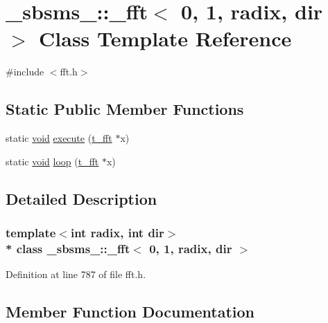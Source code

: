 \hypertarget{class__sbsms___1_1__fft_3_010_00_011_00_01radix_00_01dir_01_4}{}\section{\+\_\+sbsms\+\_\+\+:\+:\+\_\+fft$<$ 0, 1, radix, dir $>$ Class Template Reference}
\label{class__sbsms___1_1__fft_3_010_00_011_00_01radix_00_01dir_01_4}


{\ttfamily \#include $<$fft.\+h$>$}

\subsection*{Static Public Member Functions}
\begin{DoxyCompactItemize}
\item 
static \hyperlink{sound_8c_ae35f5844602719cf66324f4de2a658b3}{void} \hyperlink{class__sbsms___1_1__fft_3_010_00_011_00_01radix_00_01dir_01_4_a1b7e1777e57db2b8744d3219b3e27e07}{execute} (\hyperlink{namespace__sbsms___af5c6f976b2da21c36853e3b0c5995a54}{t\+\_\+fft} $\ast$x)
\item 
static \hyperlink{sound_8c_ae35f5844602719cf66324f4de2a658b3}{void} \hyperlink{class__sbsms___1_1__fft_3_010_00_011_00_01radix_00_01dir_01_4_a44248955f3f75c1b557e35e710ed8101}{loop} (\hyperlink{namespace__sbsms___af5c6f976b2da21c36853e3b0c5995a54}{t\+\_\+fft} $\ast$x)
\end{DoxyCompactItemize}


\subsection{Detailed Description}
\subsubsection*{template$<$int radix, int dir$>$\\*
class \+\_\+sbsms\+\_\+\+::\+\_\+fft$<$ 0, 1, radix, dir $>$}



Definition at line 787 of file fft.\+h.



\subsection{Member Function Documentation}
